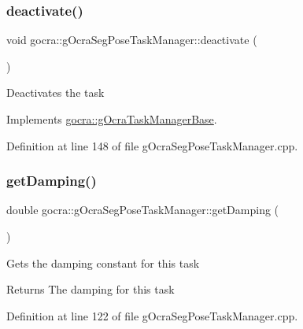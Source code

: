 \hypertarget{classgocra_1_1gOcraSegPoseTaskManager_ab544efb740604150c99b020a5e1f04de}{}\label{classgocra_1_1gOcraSegPoseTaskManager_ab544efb740604150c99b020a5e1f04de} 
\subsubsection{\texorpdfstring{deactivate()}{deactivate()}}
{\footnotesize\ttfamily void gocra\+::g\+Ocra\+Seg\+Pose\+Task\+Manager\+::deactivate (\begin{DoxyParamCaption}{ }\end{DoxyParamCaption})\hspace{0.3cm}{\ttfamily [virtual]}}

Deactivates the task 

Implements \hyperlink{classgocra_1_1gOcraTaskManagerBase_a7cf9111e69aee47a39fe0f2976a20d6c}{gocra\+::g\+Ocra\+Task\+Manager\+Base}.



Definition at line 148 of file g\+Ocra\+Seg\+Pose\+Task\+Manager.\+cpp.

\hypertarget{classgocra_1_1gOcraSegPoseTaskManager_af8a42a3b2f546377095c6c7a5849ef58}{}\label{classgocra_1_1gOcraSegPoseTaskManager_af8a42a3b2f546377095c6c7a5849ef58} 
\subsubsection{\texorpdfstring{get\+Damping()}{getDamping()}}
{\footnotesize\ttfamily double gocra\+::g\+Ocra\+Seg\+Pose\+Task\+Manager\+::get\+Damping (\begin{DoxyParamCaption}{ }\end{DoxyParamCaption})}

Gets the damping constant for this task

\begin{DoxyReturn}{Returns}
The damping for this task 
\end{DoxyReturn}


Definition at line 122 of file g\+Ocra\+Seg\+Pose\+Task\+Manager.\+cpp.

